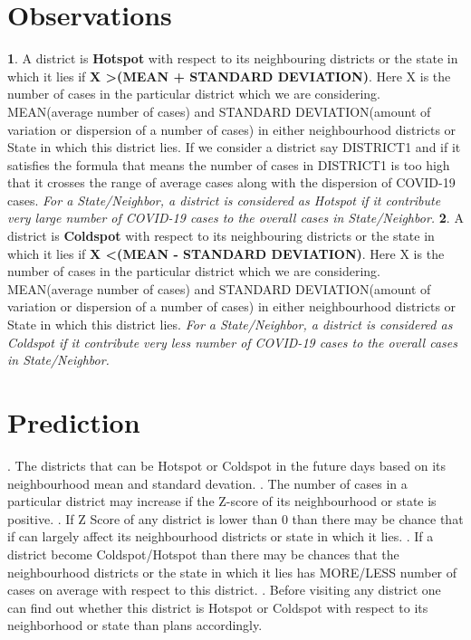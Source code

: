 \documentclass{report}
\begin{document}
\section{Observations}
\justify 
\textbf{1}. A district is \textbf{Hotspot} with respect to its neighbouring districts or the state in which it lies if \textbf{X \textgreater  (MEAN + STANDARD DEVIATION)}. Here X is the number of cases in the particular district which we are considering. MEAN(average number of cases) and STANDARD DEVIATION(amount of variation or dispersion of a number of cases) in either neighbourhood districts or State in which this district lies. \newline If we consider a district say DISTRICT1 and if it satisfies the formula that means the number of cases in DISTRICT1 is too high that it crosses the range of average cases along with the dispersion of COVID-19 cases. \textit{For a State/Neighbor, a district is considered as Hotspot if it contribute very large number of COVID-19 cases to the overall cases in State/Neighbor.}  \newline 
\textbf{2}. A district is \textbf{Coldspot} with respect to its neighbouring districts or the state in which it lies if \textbf{X \textless  (MEAN - STANDARD DEVIATION)}. Here X is the number of cases in the particular district which we are considering. MEAN(average number of cases) and STANDARD DEVIATION(amount of variation or dispersion of a number of cases) in either neighbourhood districts or State in which this district lies. \textit{For a State/Neighbor, a district is considered as Coldspot if it contribute very less number of COVID-19 cases to the overall cases in State/Neighbor.}  \newline 

\section{Prediction}
. The districts that can be Hotspot or Coldspot in the future days based on its neighbourhood mean and standard devation. . The number of cases in a particular district may increase if the Z-score of its neighbourhood or state is positive. . If Z Score of any district is lower than 0 than there may be chance that if can largely affect its neighbourhood districts or state in which it lies. . If a district become Coldspot/Hotspot than there may be chances that the neighbourhood districts or the state in which it lies has MORE/LESS number of cases on average with respect to this district. . Before visiting any district one can find out whether this district is Hotspot or Coldspot with respect to its neighborhood or state than plans accordingly.
\end{document}
